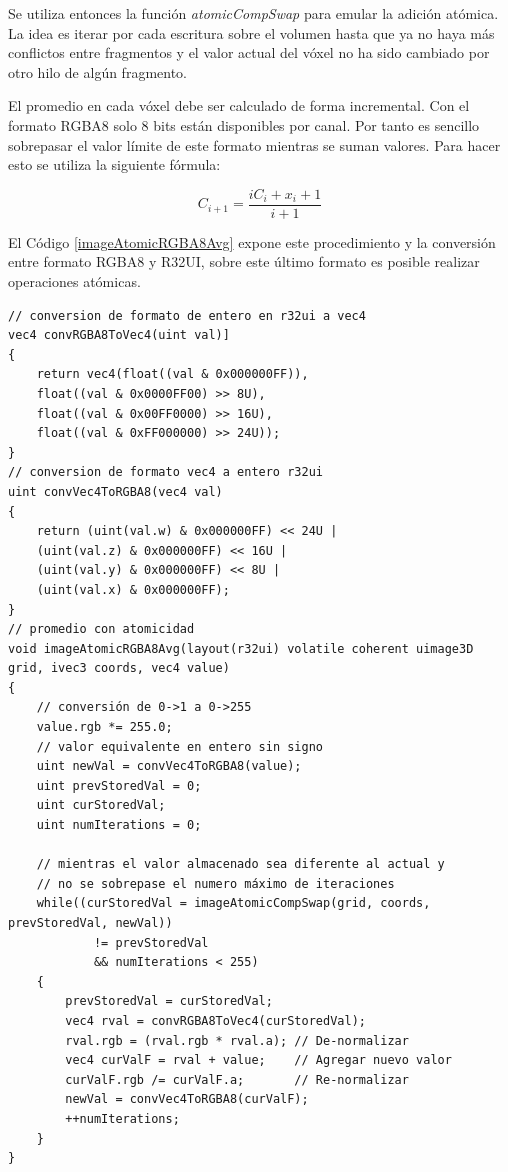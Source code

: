 Se utiliza entonces la función \emph{atomicCompSwap} para emular la adición atómica. La idea es iterar por cada escritura sobre el volumen hasta que ya no haya más conflictos entre fragmentos y el valor actual del vóxel no ha sido cambiado por otro hilo de algún fragmento.

El promedio en cada vóxel debe ser calculado de forma incremental. Con el formato RGBA8 solo 8 bits están disponibles por canal. Por tanto es sencillo sobrepasar el valor límite de este formato mientras se suman valores. Para hacer esto se utiliza la siguiente fórmula:

\begin{equation}
	C_{i+1} = \frac{iC_{i}+x_i+1}{i+1}
\end{equation}

El Código \ref{imageAtomicRGBA8Avg} expone este procedimiento y la conversión entre formato RGBA8 y R32UI, sobre este último formato es posible realizar operaciones atómicas.
\\
\begin{lstlisting}[caption={Conversion entre RGBA8 y R32UI y promedio incremental.}, label=imageAtomicRGBA8Avg]
// conversion de formato de entero en r32ui a vec4
vec4 convRGBA8ToVec4(uint val)]
{
    return vec4(float((val & 0x000000FF)), 
    float((val & 0x0000FF00) >> 8U), 
    float((val & 0x00FF0000) >> 16U), 
    float((val & 0xFF000000) >> 24U));
}
// conversion de formato vec4 a entero r32ui
uint convVec4ToRGBA8(vec4 val)
{
    return (uint(val.w) & 0x000000FF) << 24U | 
    (uint(val.z) & 0x000000FF) << 16U | 
    (uint(val.y) & 0x000000FF) << 8U | 
    (uint(val.x) & 0x000000FF);
}
// promedio con atomicidad
void imageAtomicRGBA8Avg(layout(r32ui) volatile coherent uimage3D grid, ivec3 coords, vec4 value)
{
    // conversión de 0->1 a 0->255
    value.rgb *= 255.0;
    // valor equivalente en entero sin signo
    uint newVal = convVec4ToRGBA8(value);
    uint prevStoredVal = 0;
    uint curStoredVal;
    uint numIterations = 0;

    // mientras el valor almacenado sea diferente al actual y 
    // no se sobrepase el numero máximo de iteraciones
    while((curStoredVal = imageAtomicCompSwap(grid, coords, prevStoredVal, newVal)) 
            != prevStoredVal
            && numIterations < 255)
    {
        prevStoredVal = curStoredVal;
        vec4 rval = convRGBA8ToVec4(curStoredVal);
        rval.rgb = (rval.rgb * rval.a); // De-normalizar
        vec4 curValF = rval + value;    // Agregar nuevo valor
        curValF.rgb /= curValF.a;       // Re-normalizar
        newVal = convVec4ToRGBA8(curValF);
        ++numIterations;
    }
}
\end{lstlisting}

